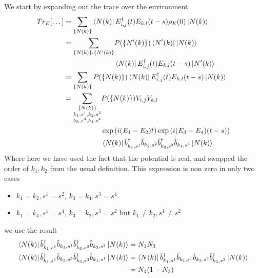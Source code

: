 We start by expanding out the trace
over the environment
\begin{align}
  Tr_E[\dots] & = \sum_{\{N(k)\}}
  \bra{N(k)} E^\dagger_{i,j}(t)E_{k,l}(t-s) \rho_E(0) \ket{N(k)}
  \\
              & = \begin{aligned}[t]
    \sum_{\{N(k)\}, \{N'(k)\}} &
    P(\{N'(k)\}) \bra{N'(k)}  \ket{N(k)}                                               \\
                               & \bra{N(k)} E^\dagger_{i,j}(t)E_{k,l}(t-s) \ket{N'(k)}
  \end{aligned} \\
              & = \sum_{\{N(k)\}}
  P(\{N(k)\}) \bra{N(k)}
  E^\dagger_{i,j}(t)E_{k,l}(t-s) \ket{N(k)} \\
              & = \begin{aligned}[t]
    \sum_{\substack{\{N(k)\}                             \\
    k_1,s^1,k_2,s^2                                      \\
        k_3,s^3,k_4,s^4 }}
     & P(\{N(k)\}) V_{i,j} V_{k,l}                       \\
     & \exp{(i(E_1 - E_2) t)} \exp{(i(E_3 - E_4) (t-s))} \\
     & \bra{N(k)}
    \hat{b}_{k_1,s^1}^\dagger{} \hat{b}_{k_2,s^2}
    \hat{b}_{k_3,s^3}^\dagger{} \hat{b}_{k_4,s^4}
    \ket{N(k)}
  \end{aligned}
\end{align}
Where here we have used
the fact that the
potential is real, and
swapped the order of \(k_1, k_2\)
from the usual definition.
This expression is non zero
in only two cases
\begin{itemize}
  \item \(k_1=k_2, s^1=s^2\),
        \(k_3=k_4, s^3=s^4\)
  \item \(k_1=k_4, s^1=s^4\),
        \(k_3=k_2, s^3=s^2\) but
        \(k_1\neq{}k_2, s^1\neq{}s^2\)
\end{itemize}
we use the result
\begin{align}
  \bra{N(k)}
  \hat{b}_{k_1,s^1}^\dagger{}
  \hat{b}_{k_1,s^1}
  \hat{b}_{k_3,s^3}^\dagger{}
  \hat{b}_{k_3,s^3}\ket{N(k)} & = N_1 N_3       \\
  \bra{N(k)}
  \hat{b}_{k_1,s^1}^\dagger{}
  \hat{b}_{k_3,s^3}
  \hat{b}_{k_3,s^3}^\dagger{}
  \hat{b}_{k_1,s^1}\ket{N(k)} & = \bra{N(k)}
  \hat{b}_{k_1,s^1}^\dagger{}
  \hat{b}_{k_1,s^1}
  \hat{b}_{k_3,s^3}
  \hat{b}_{k_3,s^3}^\dagger{}
  \ket{N(k)}                                    \\
                              & = N_1 (1 - N_3)
\end{align}
